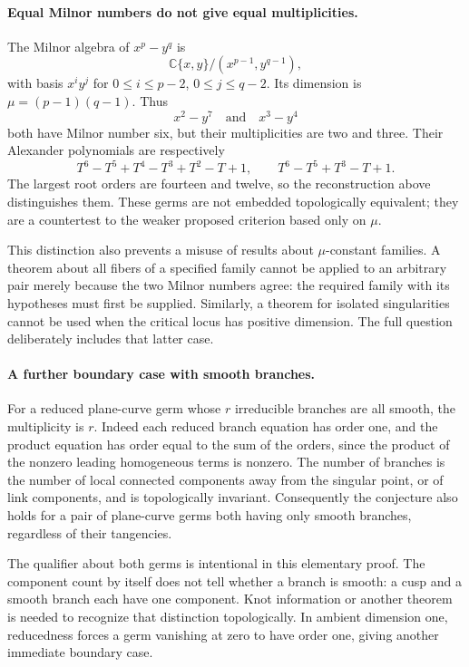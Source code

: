 \documentclass[11pt]{article}
\begin{document}
\paragraph{Equal Milnor numbers do not give equal multiplicities.}
The Milnor algebra of $x^p-y^q$ is
\[
 \mathbb C\{x,y\}/(x^{p-1},y^{q-1}),
\]
with basis $x^iy^j$ for $0\le i\le p-2$, $0\le j\le q-2$. Its dimension is $\mu=(p-1)(q-1)$. Thus
\[
 x^2-y^7\quad\text{and}\quad x^3-y^4
\]
both have Milnor number six, but their multiplicities are two and three. Their Alexander polynomials are respectively
\[
 T^6-T^5+T^4-T^3+T^2-T+1,
 \qquad T^6-T^5+T^3-T+1.                                  \tag{3}
\]
The largest root orders are fourteen and twelve, so the reconstruction above distinguishes them. These germs are not embedded topologically equivalent; they are a countertest to the weaker proposed criterion based only on $\mu$.

This distinction also prevents a misuse of results about $\mu$-constant families. A theorem about all fibers of a specified family cannot be applied to an arbitrary pair merely because the two Milnor numbers agree: the required family with its hypotheses must first be supplied. Similarly, a theorem for isolated singularities cannot be used when the critical locus has positive dimension. The full question deliberately includes that latter case.

\paragraph{A further boundary case with smooth branches.}
For a reduced plane-curve germ whose $r$ irreducible branches are all smooth, the multiplicity is $r$. Indeed each reduced branch equation has order one, and the product equation has order equal to the sum of the orders, since the product of the nonzero leading homogeneous terms is nonzero. The number of branches is the number of local connected components away from the singular point, or of link components, and is topologically invariant. Consequently the conjecture also holds for a pair of plane-curve germs both having only smooth branches, regardless of their tangencies.

The qualifier about both germs is intentional in this elementary proof. The component count by itself does not tell whether a branch is smooth: a cusp and a smooth branch each have one component. Knot information or another theorem is needed to recognize that distinction topologically. In ambient dimension one, reducedness forces a germ vanishing at zero to have order one, giving another immediate boundary case.
\end{document}
